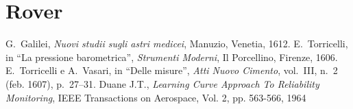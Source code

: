 \documentclass[%
corpo=11pt,
twoside,
 stile=classica,
oldstyle,
greek,%
]{toptesi}
\begin{document}
\section{Rover}


\begin{thebibliography}{9}
 G.~Galilei, {\em Nuovi studii sugli astri medicei}, Manuzio,
        Venetia, 1612.
 E.~Torricelli, in ``La pressione barometrica'', {\em Strumenti
        Moderni}, Il Porcellino, Firenze, 1606.
 E.~Torricelli e A.~Vasari, in ``Delle misure'', {\em Atti Nuovo
        Cimento}, vol.~III, n.~2 (feb. 1607), p.~27--31.
 Duane J.T., \emph{Learning Curve Approach To Reliability 
		Monitoring}, IEEE Transactions on Aerospace, Vol. 2, pp. 563-566, 1964
\end{thebibliography}
\end{document}
